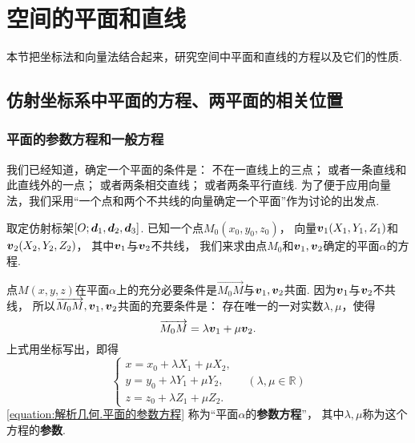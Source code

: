 \section{空间的平面和直线}
本节把坐标法和向量法结合起来，研究空间中平面和直线的方程以及它们的性质.

\subsection{仿射坐标系中平面的方程、两平面的相关位置}
\subsubsection{平面的参数方程和一般方程}
我们已经知道，确定一个平面的条件是：
不在一直线上的三点；
或者一条直线和此直线外的一点；
或者两条相交直线；
或者两条平行直线.
为了便于应用向量法，我们采用“一个点和两个不共线的向量确定一个平面”作为讨论的出发点.

取定仿射标架\([O;\boldsymbol{d}_1,\boldsymbol{d}_2,\boldsymbol{d}_3]\).
已知一个点\(M_0(x_0,y_0,z_0)\)，
向量\(\boldsymbol{v}_1(X_1,Y_1,Z_1)\)和\(\boldsymbol{v}_2(X_2,Y_2,Z_2)\)，
其中\(\boldsymbol{v}_1\)与\(\boldsymbol{v}_2\)不共线，
我们来求由点\(M_0\)和\(\boldsymbol{v}_1,\boldsymbol{v}_2\)确定的平面\(\alpha\)的方程.

点\(M(x,y,z)\)在平面\(\alpha\)上的充分必要条件是\(\vec{M_0 M}\)与\(\boldsymbol{v}_1,\boldsymbol{v}_2\)共面.
因为\(\boldsymbol{v}_1\)与\(\boldsymbol{v}_2\)不共线，
所以\(\overrightarrow{M_0 M},\boldsymbol{v}_1,\boldsymbol{v}_2\)共面的充要条件是：
存在唯一的一对实数\(\lambda,\mu\)，使得\[
	\overrightarrow{M_0 M} = \lambda \boldsymbol{v}_1 + \mu \boldsymbol{v}_2.
\]
上式用坐标写出，即得
\begin{equation}\label{equation:解析几何.平面的参数方程}
	\left\{ \begin{array}{l}
		x = x_0 + \lambda X_1 + \mu X_2, \\
		y = y_0 + \lambda Y_1 + \mu Y_2, \\
		z = z_0 + \lambda Z_1 + \mu Z_2.
	\end{array} \right.
	\quad(\lambda,\mu\in\mathbb{R})
\end{equation}
\cref{equation:解析几何.平面的参数方程}
称为“平面\(\alpha\)的\textbf{参数方程}”，
其中\(\lambda,\mu\)称为这个方程的\textbf{参数}.


